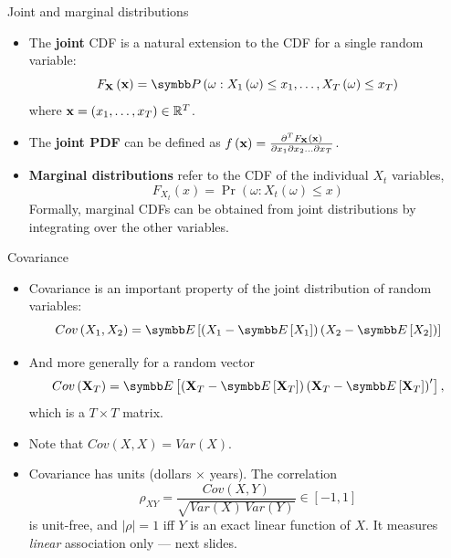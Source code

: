 \documentclass[aspectratio=169,11pt]{beamer}
\begin{document}
\begin{frame}{Joint and marginal distributions}
\begin{itemize}
\item The {\bf joint} CDF is a natural extension to the CDF for a single random variable:\[
		F_{{\bf X}} \left({\bf x}\right) = \Pr\left(\omega: X_1\left(\omega\right)\le x_1, \dots , X_T\left(\omega\right)\le x_T\right)
	\]
where ${\bf x} = \left(x_1,\dots,x_T\right)\in \mathbb{R}^T$.

\smallskip
\item The {\bf joint PDF} can be defined as $f\left( {\bf x} \right) = \frac{\partial^T F_{{\bf X}} \left({\bf x}\right)}{\partial x_1 \partial x_2 \dots \partial x_T}$.

\smallskip
\item {\bf Marginal distributions} refer to the CDF of the individual $X_t$ variables,\[
		F_{X_t} \left(x\right) = \Pr\left(\omega: X_t\left(\omega\right)\le x \right)
		\]
	Formally, marginal CDFs can be obtained  from joint distributions by integrating
		over the other variables. 


\end{itemize}
\end{frame}


\begin{frame}{Covariance}
\begin{itemize}
	\item Covariance is an important property of the joint distribution of random variables:\[
		Cov\left(X_1,X_2\right) = \E\left[ \left( X_1 - \E\left[X_1\right]\right) \left( X_2 - \E\left[X_2\right]\right)\right]
	\]

	\item And more generally for a random vector\[
		Cov\left({\bf X}_T\right) =\E\left[ \left( {\bf X}_T - \E\left[{\bf X}_T\right]\right) \left( {\bf X}_T - \E\left[{\bf X}_T\right]\right)'\right],
	\]
	which is a $T\times T$ matrix. 

	\item Note that $Cov\left(X,X\right) = Var\left(X\right)$.
	\item Covariance has units (dollars $\times$ years). The \alert{correlation}\[
		\rho_{XY} = \frac{Cov(X,Y)}{\sqrt{Var(X)\,Var(Y)}} \in [-1, 1]
	\]
	is unit-free, and $|\rho| = 1$ iff $Y$ is an exact linear function of $X$. It measures
	\emph{linear} association only --- next slides.
\end{itemize}
\end{frame}
\end{document}
